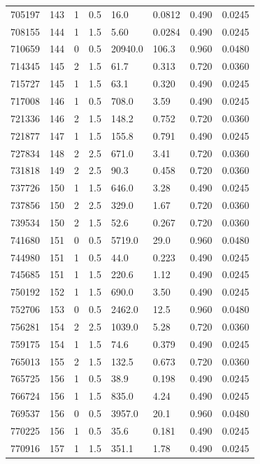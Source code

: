 \documentclass[preview]{standalone}
\begin{document}
{{{{{{{\begin{tabular}{L{1.2cm}C{1.2cm} C{0.3cm}C{0.5cm} C{1.4cm}C{1.4cm} C{1.4cm}C{1.4cm}}
  705197  &   143  & 1     & 0.5 &  16.0  & 0.0812  & 0.490 &  0.0245   \\ 
  708155  &   144  & 1     & 1.5 &  5.60  & 0.0284  & 0.490 &  0.0245   \\ 
  710659  &   144  & 0     & 0.5 &  20940.0  & 106.3  & 0.960 &  0.0480   \\ 
  714345  &   145  & 2     & 1.5 &  61.7  & 0.313  & 0.720 &  0.0360   \\ 
  715727  &   145  & 1     & 1.5 &  63.1  & 0.320  & 0.490 &  0.0245   \\ 
  717008  &   146  & 1     & 0.5 &  708.0  & 3.59  & 0.490 &  0.0245   \\ 
  721336  &   146  & 2     & 1.5 &  148.2  & 0.752  & 0.720 &  0.0360   \\ 
  721877  &   147  & 1     & 1.5 &  155.8  & 0.791  & 0.490 &  0.0245   \\ 
  727834  &   148  & 2     & 2.5 &  671.0  & 3.41  & 0.720 &  0.0360   \\ 
  731818  &   149  & 2     & 2.5 &  90.3  & 0.458  & 0.720 &  0.0360   \\ 
  737726  &   150  & 1     & 1.5 &  646.0  & 3.28  & 0.490 &  0.0245   \\ 
  737856  &   150  & 2     & 2.5 &  329.0  & 1.67  & 0.720 &  0.0360   \\ 
  739534  &   150  & 2     & 1.5 &  52.6  & 0.267  & 0.720 &  0.0360   \\ 
  741680  &   151  & 0     & 0.5 &  5719.0  & 29.0  & 0.960 &  0.0480   \\ 
  744980  &   151  & 1     & 0.5 &  44.0  & 0.223  & 0.490 &  0.0245   \\ 
  745685  &   151  & 1     & 1.5 &  220.6  & 1.12  & 0.490 &  0.0245   \\ 
  750192  &   152  & 1     & 1.5 &  690.0  & 3.50  & 0.490 &  0.0245   \\ 
  752706  &   153  & 0     & 0.5 &  2462.0  & 12.5  & 0.960 &  0.0480   \\ 
  756281  &   154  & 2     & 2.5 &  1039.0  & 5.28  & 0.720 &  0.0360   \\ 
  759175  &   154  & 1     & 1.5 &  74.6  & 0.379  & 0.490 &  0.0245   \\ 
  765013  &   155  & 2     & 1.5 &  132.5  & 0.673  & 0.720 &  0.0360   \\ 
  765725  &   156  & 1     & 0.5 &  38.9  & 0.198  & 0.490 &  0.0245   \\ 
  766724  &   156  & 1     & 1.5 &  835.0  & 4.24  & 0.490 &  0.0245   \\ 
  769537  &   156  & 0     & 0.5 &  3957.0  & 20.1  & 0.960 &  0.0480   \\ 
  770225  &   156  & 1     & 0.5 &  35.6  & 0.181  & 0.490 &  0.0245   \\ 
  770916  &   157  & 1     & 1.5 &  351.1  & 1.78  & 0.490 &  0.0245   \\ 
\hline 
\end{tabular} 

}}}}}}}
\end{document}
